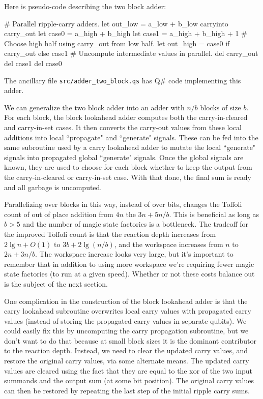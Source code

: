 \documentclass[onecolumn,unpublished]{quantumarticle}
\theoremstyle{definition}
\theoremstyle{definition}
\theoremstyle{definition}
\begin{document}
Here is pseudo-code describing the two block adder:

\begin{python}
    # Parallel ripple-carry adders.
    let out_low = a_low + b_low carryinto carry_out
    let case0 = a_high + b_high
    let case1 = a_high + b_high + 1
    # Choose high half using carry_out from low half.
    let out_high = case0 if carry_out else case1
    # Uncompute intermediate values in parallel.
    del carry_out
    del case1
    del case0
\end{python}

The ancillary file \texttt{src/adder\_two\_block.qs} has Q\# code implementing this adder.

We can generalize the two block adder into an adder with $n/b$ blocks of size $b$.
For each block, the block lookahead adder computes both the carry-in-cleared and carry-in-set cases.
It then converts the carry-out values from these local additions into local ``propagate" and ``generate" signals.
These can be fed into the same subroutine used by a carry lookahead adder to mutate the local ``generate" signals into propagated global ``generate" signals.
Once the global signals are known, they are used to choose for each block whether to keep the output from the carry-in-cleared or carry-in-set case.
With that done, the final sum is ready and all garbage is uncomputed.

Parallelizing over blocks in this way, instead of over bits, changes the Toffoli count of out of place addition from $4n$ the $3n + 5n/b$.
This is beneficial as long as $b > 5$ and the number of magic state factories is a bottleneck.
The tradeoff for the improved Toffoli count is that the reaction depth increases from $2 \lg n + O(1)$ to $3 b + 2 \lg(n/b)$, and the workspace increases from $n$ to $2n + 3n/b$.
The workspace increase looks very large, but it's important to remember that in addition to using more workspace we're requiring fewer magic state factories (to run at a given speed).
Whether or not these costs balance out is the subject of the next section.

One complication in the construction of the block lookahead adder is that the carry lookahead subroutine overwrites local carry values with propagated carry values (instead of storing the propagated carry values in separate qubits).
We could easily fix this by uncomputing the carry propagation subroutine, but we don't want to do that because at small block sizes it is the dominant contributor to the reaction depth.
Instead, we need to clear the updated carry values, and restore the original carry values, via some alternate means.
The updated carry values are cleared using the fact that they are equal to the xor of the two input summands and the output sum (at some bit position).
The original carry values can then be restored by repeating the last step of the initial ripple carry sums.
\end{document}
